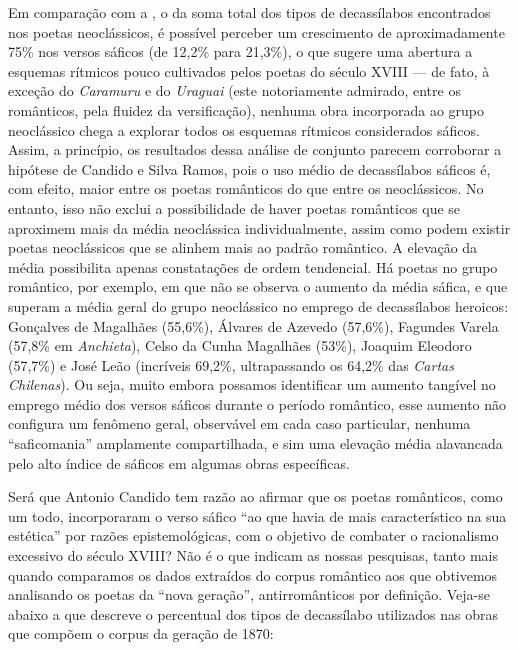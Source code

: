 \documentclass[portuguese]{textolivre}
\begin{document}
Em comparação com a , o da soma total dos tipos de decassílabos encontrados nos poetas neoclássicos, é possível perceber um crescimento de aproximadamente 75\% nos versos sáficos (de 12,2\% para 21,3\%), o que sugere uma abertura a esquemas rítmicos pouco cultivados pelos poetas do século XVIII — de fato, à exceção do \textit{Caramuru} e do \textit{Uraguai} (este notoriamente admirado, entre os românticos, pela fluidez da versificação), nenhuma obra incorporada ao grupo neoclássico chega a explorar todos os esquemas rítmicos considerados sáficos. Assim, a princípio, os resultados dessa análise de conjunto parecem corroborar a hipótese de Candido e Silva Ramos, pois o uso médio de decassílabos sáficos é, com efeito, maior entre os poetas românticos do que entre os neoclássicos. No entanto, isso não exclui a possibilidade de haver poetas românticos que se aproximem mais da média neoclássica individualmente, assim como podem existir poetas neoclássicos que se alinhem mais ao padrão romântico. A elevação da média possibilita apenas constatações de ordem tendencial. Há poetas no grupo romântico, por exemplo, em que não se observa o aumento da média sáfica, e que superam a média geral do grupo neoclássico no emprego de decassílabos heroicos: Gonçalves de Magalhães (55,6\%), Álvares de Azevedo (57,6\%), Fagundes Varela (57,8\% em \textit{Anchieta}), Celso da Cunha Magalhães (53\%), Joaquim Eleodoro (57,7\%) e José Leão (incríveis 69,2\%, ultrapassando os 64,2\% das \textit{Cartas Chilenas}). Ou seja, muito embora possamos identificar um aumento tangível no emprego médio dos versos sáficos durante o período romântico, esse aumento não configura um fenômeno geral, observável em cada caso particular, nenhuma “saficomania” amplamente compartilhada, e sim uma elevação média alavancada pelo alto índice de sáficos em algumas obras específicas.

Será que Antonio Candido tem razão ao afirmar que os poetas românticos, como um todo, incorporaram o verso sáfico “ao que havia de mais característico na sua estética” \cite[p.~36]{candido2000formacao} por razões epistemológicas, com o objetivo de combater o racionalismo excessivo do século XVIII? Não é o que indicam as nossas pesquisas, tanto mais quando comparamos os dados extraídos do corpus romântico aos que obtivemos analisando os poetas da “nova geração”, antirromânticos por definição. Veja-se abaixo a  que descreve o percentual dos tipos de decassílabo utilizados nas obras que compõem o corpus da geração de 1870:
\end{document}
